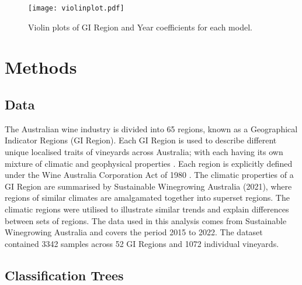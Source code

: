 \documentclass[review,12pt,authoryear]{elsarticle}
\begin{document}
\begin{linenumbers}
\begin{figure}
    \texttt{[image: violinplot.pdf]}
    \caption{Violin plots of GI Region and Year coefficients for each model.}\label{fig:violin}
    \end{figure}
\fi{}

\section{Methods}


\subsection{Data}
The Australian wine industry is divided into 65 regions, known as a Geographical Indicator Regions (GI Region). Each GI Region is used to describe different unique localised traits of vineyards across Australia; with each having its own mixture of climatic and geophysical properties \autocite{hallidayAustralianWineEncyclopedia2009,oliverReviewSoilPhysical2013,soarClimateDriversRed2008}. Each region is explicitly defined under the Wine Australia Corporation Act of 1980 \autocite{attorney-generalsdepartmentWineAustraliaCorporation2010}. The climatic properties of a GI Region are summarised by Sustainable Winegrowing Australia (2021), where regions of similar climates are amalgamated together into superset regions. The climatic regions were utilised to illustrate similar trends and explain differences between sets of regions.
The data used in this analysis comes from Sustainable Winegrowing Australia and covers the period 2015 to 2022. The dataset contained 3342 samples across 52 GI Regions and 1072 individual vineyards.


\subsection{Classification Trees}


\end{linenumbers}
\end{document}
